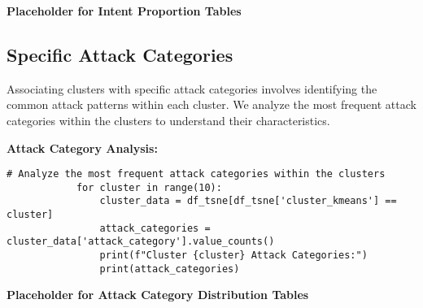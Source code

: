         \textbf{Placeholder for Intent Proportion Tables}
        
    \subsection{Specific Attack Categories}
    
        Associating clusters with specific attack categories involves identifying the common attack patterns within each cluster. We analyze the most frequent attack categories within the clusters to understand their characteristics.

        \textbf{Attack Category Analysis:}
        
        \vspace{0.5em}

        \begin{lstlisting}[caption={Attack Categories Analysis by Cluster}, label={lst:attack_categories}]
            # Analyze the most frequent attack categories within the clusters
            for cluster in range(10):
                cluster_data = df_tsne[df_tsne['cluster_kmeans'] == cluster]
                attack_categories = cluster_data['attack_category'].value_counts()
                print(f"Cluster {cluster} Attack Categories:")
                print(attack_categories)
        \end{lstlisting}

        \textbf{Placeholder for Attack Category Distribution Tables}
